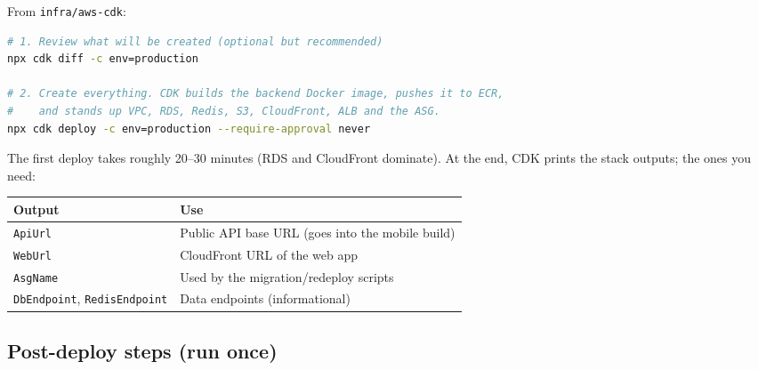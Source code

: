 \documentclass[11pt,a4paper]{article}
\begin{document}
From \texttt{infra/aws-cdk}:

\begin{lstlisting}[language=bash]
# 1. Review what will be created (optional but recommended)
npx cdk diff -c env=production

# 2. Create everything. CDK builds the backend Docker image, pushes it to ECR,
#    and stands up VPC, RDS, Redis, S3, CloudFront, ALB and the ASG.
npx cdk deploy -c env=production --require-approval never
\end{lstlisting}

The first deploy takes roughly 20--30 minutes (RDS and CloudFront dominate). At
the end, CDK prints the stack outputs; the ones you need:

\begin{center}
\begin{tabular}{@{}ll@{}}
\toprule
\textbf{Output} & \textbf{Use} \\
\midrule
\texttt{ApiUrl}   & Public API base URL (goes into the mobile build) \\
\texttt{WebUrl}   & CloudFront URL of the web app \\
\texttt{AsgName}  & Used by the migration/redeploy scripts \\
\texttt{DbEndpoint}, \texttt{RedisEndpoint} & Data endpoints (informational) \\
\bottomrule
\end{tabular}
\end{center}

\subsection{Post-deploy steps (run once)}
\end{document}

